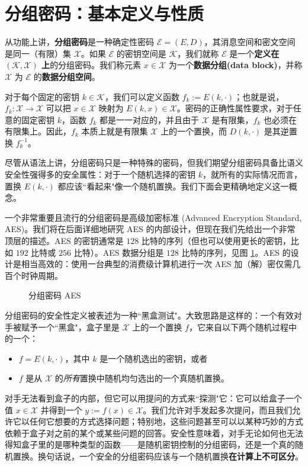 \section{分组密码：基本定义与性质}\label{sec:4-1}

从功能上讲，\textbf{分组密码}是一种确定性密码 $\mathcal{E}=(E,D)$，其消息空间和密文空间是同一（有限）集 $\mathcal{X}$。如果 $\mathcal{E}$ 的密钥空间是 $\mathcal{K}$，我们就称 $\mathcal{E}$ 是一个\textbf{定义在 $(\mathcal{K},\mathcal{X})$ 上}的分组密码。我们称元素 $x\in\mathcal{X}$ 为一个\textbf{数据分组(data block)}，并称 $\mathcal{X}$ 为 $\mathcal{E}$ 的\textbf{数据分组空间}。

对于每个固定的密钥 $k\in\mathcal{K}$，我们可以定义函数 $f_k:=E(k,\cdot)$；也就是说，$f_k:\mathcal{X}\to\mathcal{X}$ 可以把 $x\in\mathcal{X}$ 映射为 $E(k,x)\in\mathcal{X}$。密码的正确性属性要求，对于任意的固定密钥 $k$，函数 $f_k$ 都是一一对应的，并且由于 $\mathcal{X}$ 是有限集，$f_k$ 也必须在有限集上。因此，$f_k$ 本质上就是有限集 $\mathcal{X}$ 上的一个置换，而 $D(k,\cdot)$ 是其逆置换 $f^{-1}_k$。

尽管从语法上讲，分组密码只是一种特殊的密码，但我们期望分组密码具备比语义安全性强得多的安全属性：对于一个随机选择的密钥 $k$，就所有的实际情况而言，置换 $E(k,\cdot)$ 都应该``看起来"像一个随机置换。我们下面会更精确地定义这一概念。

一个非常重要且流行的分组密码是高级加密标准 (Advanced Encryption Standard, AES)。我们将在后面详细地研究 AES 的内部设计，但现在我们先给出一个非常顶层的描述。AES 的密钥通常是 $128$ 比特的序列（但也可以使用更长的密钥，比如 $192$ 比特或 $256$ 比特）。AES 数据分组是 $128$ 比特的序列，见图 \ref{fig:4-1}。AES 的设计是相当高效的：使用一台典型的消费级计算机进行一次 AES 加（解）密仅需几百个时钟周期。

\begin{figure}
  \centering
  
  \caption{分组密码 AES}
  \label{fig:4-1}
\end{figure}

分组密码的安全性定义被表述为一种``黑盒测试"。大致思路是这样的：一个有效对手被赋予一个``黑盒"，盒子里是 $\mathcal{X}$ 上的一个置换 $f$，它来自以下两个随机过程中的一个：
\begin{itemize}
	\item $f=E(k,\cdot)$，其中 $k$ 是一个随机选出的密钥，或者
	\item $f$ 是从 $\mathcal{X}$ 的\emph{所有}置换中随机均匀选出的一个真随机置换。
\end{itemize}
对手无法看到盒子的内部，但它可以用提问的方式来``探测"它：它可以给盒子一个值 $x\in\mathcal{X}$ 并得到一个 $y:=f(x)\in\mathcal{X}$。我们允许对手发起多次提问，而且我们允许它以任何它想要的方式选择问题；特别地，这些问题甚至可以以某种巧妙的方式依赖于盒子对之前的某个或某些问题的回答。安全性意味着，对手无论如何也无法得知盒子里的是哪种类型的函数——是随机密钥控制的分组密码，还是一个真的随机置换。换句话说，一个安全的分组密码应该与一个随机置换\textbf{在计算上不可区分}。

